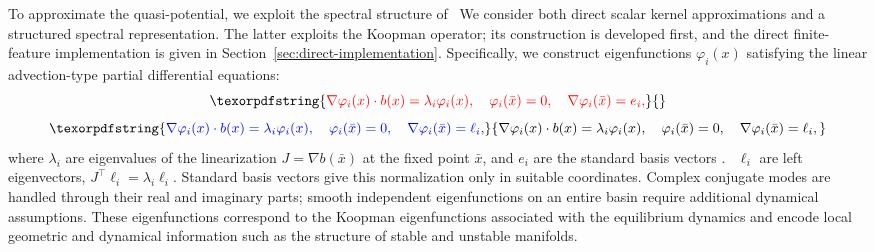 \documentclass[11pt]{article}
\theoremstyle{plain}      %
\theoremstyle{definition} %
\providecommand{\DIFaddtex}[1]{{\protect\color{blue}#1}} %
\providecommand{\DIFdeltex}[1]{{\protect\color{red}#1}} %
\providecommand{\DIFaddbegin}{} %
\providecommand{\DIFaddend}{} %
\providecommand{\DIFdelbegin}{} %
\providecommand{\DIFdelend}{} %
\providecommand{\DIFadd}[1]{\texorpdfstring{\DIFaddtex{#1}}{#1}} %
\providecommand{\DIFdel}[1]{\texorpdfstring{\DIFdeltex{#1}}{}} %
\newcommand{\DIFscaledelfig}{1.0}
\newlength{\DIFdelgraphicswidth} %
\newlength{\DIFdelgraphicsheight} %
\newcommand{\DIFaddincludegraphics}[2][]{{\color{blue}\fbox{\DIFOincludegraphics[#1]{#2}}}} %
\newcommand{\DIFdelincludegraphics}[2][]{%
\sbox{\DIFdelgraphicsbox}{\DIFOincludegraphics[#1]{#2}}%
\settoboxwidth{\DIFdelgraphicswidth}{\DIFdelgraphicsbox} %
\settoboxtotalheight{\DIFdelgraphicsheight}{\DIFdelgraphicsbox} %
\scalebox{\DIFscaledelfig}{%
\parbox[b]{\DIFdelgraphicswidth}{\usebox{\DIFdelgraphicsbox}\\[-\baselineskip] \rule{\DIFdelgraphicswidth}{0em}}\llap{\resizebox{\DIFdelgraphicswidth}{\DIFdelgraphicsheight}{%
\setlength{\unitlength}{\DIFdelgraphicswidth}%
\begin{picture}(1,1)%
\thicklines\linethickness{2pt} %
{\color[rgb]{1,0,0}\put(0,0){\framebox(1,1){}}}%
{\color[rgb]{1,0,0}\put(0,0){\line( 1,1){1}}}%
{\color[rgb]{1,0,0}\put(0,1){\line(1,-1){1}}}%
\end{picture}%
}\hspace*{3pt}}} %
} %
\DeclareRobustCommand{\DIFaddbegin}{\DIFOaddbegin \let\includegraphics\DIFaddincludegraphics} %
\DeclareRobustCommand{\DIFaddend}{\DIFOaddend \let\includegraphics\DIFOincludegraphics} %
\DeclareRobustCommand{\DIFdelbegin}{\DIFOdelbegin \let\includegraphics\DIFdelincludegraphics} %
\DeclareRobustCommand{\DIFdelend}{\DIFOaddend \let\includegraphics\DIFOincludegraphics} %
\begin{document}
\DIFdelbegin \DIFdel{To approximate the quasi-potential, we exploit the spectral structure of }\DIFdelend\ \DIFaddbegin \DIFadd{We consider both direct scalar kernel approximations and a structured spectral representation. The latter exploits }\DIFaddend the Koopman operator\DIFaddbegin \DIFadd{; its construction is developed first, and the direct finite-feature implementation is given in Section~\ref{sec:direct-implementation}}\DIFaddend . Specifically, we construct eigenfunctions \( \varphi_i(x) \) satisfying the linear advection-type partial differential equations:
\DIFdelbegin \begin{displaymath}
\DIFdel{\nabla \varphi_i(x) \cdot b(x) = \lambda_i \varphi_i(x), \quad \varphi_i(\bar{x}) = 0, \quad \nabla \varphi_i(\bar{x}) = e_i,
}\end{displaymath}%
\DIFdelend \DIFaddbegin \begin{equation}
\DIFadd{\nabla \varphi_i(x) \cdot b(x) = \lambda_i \varphi_i(x), \quad \varphi_i(\bar{x}) = 0, \quad \nabla \varphi_i(\bar{x}) = \ell_i,
}\end{equation}\DIFaddend 
where \( \lambda_i \) are eigenvalues of the linearization \( J = \nabla b(\bar{x}) \) at the fixed point \( \bar{x} \), and \DIFdelbegin \DIFdel{\( e_i \) are the standard basis vectors . }\DIFdelend\ \DIFaddbegin \DIFadd{\(\ell_i\) are left eigenvectors, \(J^\top\ell_i=\lambda_i\ell_i\). Standard basis vectors give this normalization only in suitable coordinates. Complex conjugate modes are handled through their real and imaginary parts; smooth independent eigenfunctions on an entire basin require additional dynamical assumptions. }\DIFaddend These eigenfunctions correspond to the Koopman eigenfunctions associated with the equilibrium dynamics and encode local geometric and dynamical information such as the structure of stable and unstable manifolds.
\end{document}
